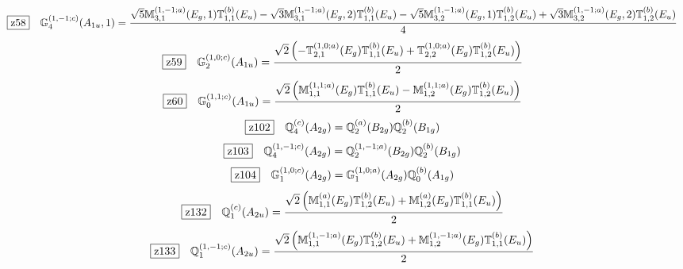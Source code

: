 \documentclass[fleqn,10pt,landscape]{jsarticle}
\begin{document}
\begin{dmath*}
\hspace*{3mm}\fbox{z58}\quad \mathbb{G}_{4}^{(1,-1;c)}(A_{1u},1)=\frac{\sqrt{5} \mathbb{M}_{3,1}^{(1,-1;a)}(E_{g},1) \mathbb{T}_{1,1}^{(b)}(E_{u}) - \sqrt{3} \mathbb{M}_{3,1}^{(1,-1;a)}(E_{g},2) \mathbb{T}_{1,1}^{(b)}(E_{u}) - \sqrt{5} \mathbb{M}_{3,2}^{(1,-1;a)}(E_{g},1) \mathbb{T}_{1,2}^{(b)}(E_{u}) + \sqrt{3} \mathbb{M}_{3,2}^{(1,-1;a)}(E_{g},2) \mathbb{T}_{1,2}^{(b)}(E_{u})}{4}
\end{dmath*}
\begin{dmath*}
\hspace*{3mm}\fbox{z59}\quad \mathbb{G}_{2}^{(1,0;c)}(A_{1u})=\frac{\sqrt{2} \left(- \mathbb{T}_{2,1}^{(1,0;a)}(E_{g}) \mathbb{T}_{1,1}^{(b)}(E_{u}) + \mathbb{T}_{2,2}^{(1,0;a)}(E_{g}) \mathbb{T}_{1,2}^{(b)}(E_{u})\right)}{2}
\end{dmath*}
\begin{dmath*}
\hspace*{3mm}\fbox{z60}\quad \mathbb{G}_{0}^{(1,1;c)}(A_{1u})=\frac{\sqrt{2} \left(\mathbb{M}_{1,1}^{(1,1;a)}(E_{g}) \mathbb{T}_{1,1}^{(b)}(E_{u}) - \mathbb{M}_{1,2}^{(1,1;a)}(E_{g}) \mathbb{T}_{1,2}^{(b)}(E_{u})\right)}{2}
\end{dmath*}
\begin{dmath*}
\hspace*{3mm}\fbox{z102}\quad \mathbb{Q}_{4}^{(c)}(A_{2g})=\mathbb{Q}_{2}^{(a)}(B_{2g}) \mathbb{Q}_{2}^{(b)}(B_{1g})
\end{dmath*}
\begin{dmath*}
\hspace*{3mm}\fbox{z103}\quad \mathbb{Q}_{4}^{(1,-1;c)}(A_{2g})=\mathbb{Q}_{2}^{(1,-1;a)}(B_{2g}) \mathbb{Q}_{2}^{(b)}(B_{1g})
\end{dmath*}
\begin{dmath*}
\hspace*{3mm}\fbox{z104}\quad \mathbb{G}_{1}^{(1,0;c)}(A_{2g})=\mathbb{G}_{1}^{(1,0;a)}(A_{2g}) \mathbb{Q}_{0}^{(b)}(A_{1g})
\end{dmath*}
\begin{dmath*}
\hspace*{3mm}\fbox{z132}\quad \mathbb{Q}_{1}^{(c)}(A_{2u})=\frac{\sqrt{2} \left(\mathbb{M}_{1,1}^{(a)}(E_{g}) \mathbb{T}_{1,2}^{(b)}(E_{u}) + \mathbb{M}_{1,2}^{(a)}(E_{g}) \mathbb{T}_{1,1}^{(b)}(E_{u})\right)}{2}
\end{dmath*}
\begin{dmath*}
\hspace*{3mm}\fbox{z133}\quad \mathbb{Q}_{1}^{(1,-1;c)}(A_{2u})=\frac{\sqrt{2} \left(\mathbb{M}_{1,1}^{(1,-1;a)}(E_{g}) \mathbb{T}_{1,2}^{(b)}(E_{u}) + \mathbb{M}_{1,2}^{(1,-1;a)}(E_{g}) \mathbb{T}_{1,1}^{(b)}(E_{u})\right)}{2}
\end{dmath*}
\end{document}
